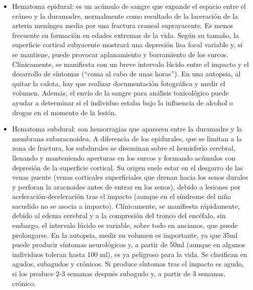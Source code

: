 \begin{itemize}
	\item Hematoma epidural: es un acúmulo de sangre que expande el espacio entre el cráneo y la duramadre, normalmente como resultado de la laceración de la arteria meníngea media por una fractura craneal suprayacente. Es menos frecuente su formación en edades extremas de la vida. Según su tamaño, la superficie cortical subyacente mostrará una depresión lisa focal variable y, si se mantiene, puede provocar aplanamiento y borramiento de los surcos. Clínicamente, se manifiesta con un breve intervalo lúcido entre el impacto y el desarrollo de síntomas (“coma al cabo de unas horas”). En una autopsia, al quitar la calota, hay que realizar documentación fotográfica y medir el volumen. Además, el envío de la sangre para análisis toxicológico puede ayudar a determinar si el individuo estaba bajo la influencia de alcohol o drogas en el momento de la lesión. 
	\item Hematoma subdural: son hemorragias que aparecen entre la duramadre y la membrana subaracnoidea. A diferencia de los epidurales, que se limitan a la zona de fractura, los subdurales se diseminan sobre el hemisferio cerebral, llenando y manteniendo aperturas en los surcos y formando acúmulos con depresión de la superficie cortical. Su origen suele estar en el desgarro de las venas puente (venas corticales superficiales que drenan hacia los senos durales y perforan la aracnoides antes de entrar en los senos), debido a lesiones por aceleración-deceleración tras el impacto (aunque en el síndrome del niño sacudido no se asocia a impacto). Clínicamente, se manifiesta rápidamente, debido al edema cerebral y a la compresión del tronco del encéfalo, sin embargo, el intervalo lúcido es variable, sobre todo en ancianos, que puede prolongarse. En la autopsia, medir su volumen es importante, ya que 35ml puede producir síntomas neurológicos y, a partir de 50ml (aunque en algunos individuos toleran hasta 100 ml), es ya peligroso para la vida. Se clasifican en agudos, subagudos y crónicos. Si produce síntomas tras el impacto es agudo, si los produce 2-3 semanas después subagudo y, a partir de 3 semanas, crónico. 

\end{itemize}

